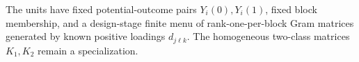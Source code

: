 The units have fixed potential-outcome pairs \(Y_i(0),Y_i(1)\), fixed block membership, and a design-stage finite menu of rank-one-per-block Gram matrices generated by known positive loadings \(d_{j\ell k}\). The homogeneous two-class matrices \(K_1,K_2\) remain a specialization.